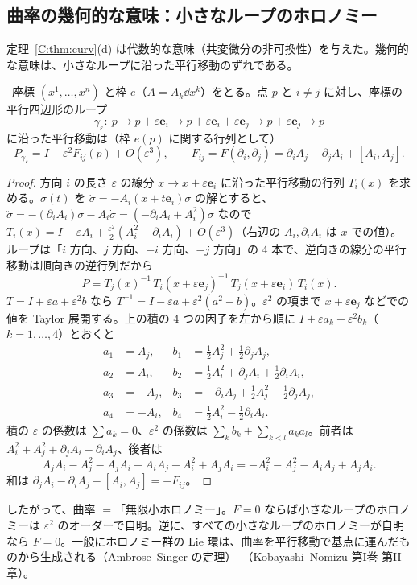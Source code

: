 \subsection{曲率の幾何的な意味：小さなループのホロノミー}
\label{C:ss:geom}
定理~\ref{C:thm:curv}(d) は代数的な意味（共変微分の非可換性）を与えた。幾何的な意味は、小さなループに沿った平行移動のずれである。

\begin{prop}[小さな平行四辺形のホロノミー]\label{C:prop:smallloop}\tP\
座標 $(x^1,\dots,x^n)$ と枠 $e$（$A=A_k\dd x^k$）をとる。点 $p$ と $i\ne j$ に対し、座標の平行四辺形のループ
\[
\gamma_\varepsilon:\ p\to p+\varepsilon\mathbf e_i\to p+\varepsilon\mathbf e_i+\varepsilon\mathbf e_j\to p+\varepsilon\mathbf e_j\to p
\]
に沿った平行移動は（枠 $e(p)$ に関する行列として）
\[
P_{\gamma_\varepsilon}=I-\varepsilon^2F_{ij}(p)+O(\varepsilon^3),\qquad F_{ij}=F(\partial_i,\partial_j)=\partial_iA_j-\partial_jA_i+[A_i,A_j].
\]
\end{prop}
\begin{proof}
方向 $i$ の長さ $\varepsilon$ の線分 $x\to x+\varepsilon\mathbf e_i$ に沿った平行移動の行列 $T_i(x)$ を求める。$\sigma(t)$ を $\dot\sigma=-A_i(x+t\mathbf e_i)\sigma$ の解とすると、$\ddot\sigma=-(\partial_iA_i)\sigma-A_i\dot\sigma=(-\partial_iA_i+A_i^2)\sigma$ なので $T_i(x)=I-\varepsilon A_i+\frac{\varepsilon^2}2(A_i^2-\partial_iA_i)+O(\varepsilon^3)$（右辺の $A_i,\partial_iA_i$ は $x$ での値）。ループは「$i$ 方向、$j$ 方向、$-i$ 方向、$-j$ 方向」の 4 本で、逆向きの線分の平行移動は順向きの逆行列だから
\[
P=T_j(x)^{-1}\,T_i(x+\varepsilon\mathbf e_j)^{-1}\,T_j(x+\varepsilon\mathbf e_i)\,T_i(x).
\]
$T=I+\varepsilon a+\varepsilon^2b$ なら $T^{-1}=I-\varepsilon a+\varepsilon^2(a^2-b)$。$\varepsilon^2$ の項まで $x+\varepsilon\mathbf e_j$ などでの値を Taylor 展開する。上の積の 4 つの因子を左から順に $I+\varepsilon a_k+\varepsilon^2b_k$（$k=1,\dots,4$）とおくと
\begin{align*}
a_1&=A_j,&b_1&=\tfrac12A_j^2+\tfrac12\partial_jA_j,\\
a_2&=A_i,&b_2&=\tfrac12A_i^2+\partial_jA_i+\tfrac12\partial_iA_i,\\
a_3&=-A_j,&b_3&=-\partial_iA_j+\tfrac12A_j^2-\tfrac12\partial_jA_j,\\
a_4&=-A_i,&b_4&=\tfrac12A_i^2-\tfrac12\partial_iA_i.
\end{align*}
積の $\varepsilon$ の係数は $\sum a_k=0$、$\varepsilon^2$ の係数は $\sum_kb_k+\sum_{k<l}a_ka_l$。前者は $A_i^2+A_j^2+\partial_jA_i-\partial_iA_j$、後者は
\[
A_jA_i-A_j^2-A_jA_i-A_iA_j-A_i^2+A_jA_i=-A_i^2-A_j^2-A_iA_j+A_jA_i.
\]
和は $\partial_jA_i-\partial_iA_j-[A_i,A_j]=-F_{ij}$。
\end{proof}
したがって、曲率 $=$「無限小ホロノミー」。$F=0$ ならば小さなループのホロノミーは $\varepsilon^2$ のオーダーで自明。逆に、すべての小さなループのホロノミーが自明なら $F=0$。一般にホロノミー群の Lie 環は、曲率を平行移動で基点に運んだものから生成される（Ambrose--Singer の定理）\tC\ （Kobayashi--Nomizu 第I巻 第II章）。

